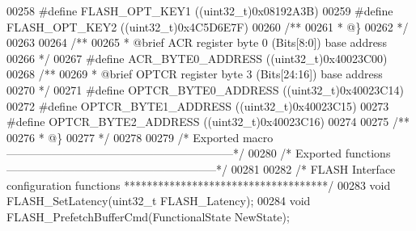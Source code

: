 \begin{DoxyCode}
00258 \textcolor{preprocessor}{#}\textcolor{preprocessor}{define} \textcolor{preprocessor}{FLASH\_OPT\_KEY1}           \textcolor{preprocessor}{(}\textcolor{preprocessor}{(}\textcolor{preprocessor}{uint32\_t}\textcolor{preprocessor}{)}0x08192A3B\textcolor{preprocessor}{)}
00259 \textcolor{preprocessor}{#}\textcolor{preprocessor}{define} \textcolor{preprocessor}{FLASH\_OPT\_KEY2}           \textcolor{preprocessor}{(}\textcolor{preprocessor}{(}\textcolor{preprocessor}{uint32\_t}\textcolor{preprocessor}{)}0x4C5D6E7F\textcolor{preprocessor}{)}
00260 \textcolor{comment}{/**}
00261 \textcolor{comment}{  * @\}}
00262 \textcolor{comment}{  */}
00263 
00264 \textcolor{comment}{/** }
00265 \textcolor{comment}{  * @brief   ACR register byte 0 (Bits[8:0]) base address  }
00266 \textcolor{comment}{  */}
00267 \textcolor{preprocessor}{#}\textcolor{preprocessor}{define} \textcolor{preprocessor}{ACR\_BYTE0\_ADDRESS}           \textcolor{preprocessor}{(}\textcolor{preprocessor}{(}\textcolor{preprocessor}{uint32\_t}\textcolor{preprocessor}{)}0x40023C00\textcolor{preprocessor}{)}
00268 \textcolor{comment}{/** }
00269 \textcolor{comment}{  * @brief   OPTCR register byte 3 (Bits[24:16]) base address  }
00270 \textcolor{comment}{  */}
00271 \textcolor{preprocessor}{#}\textcolor{preprocessor}{define} \textcolor{preprocessor}{OPTCR\_BYTE0\_ADDRESS}         \textcolor{preprocessor}{(}\textcolor{preprocessor}{(}\textcolor{preprocessor}{uint32\_t}\textcolor{preprocessor}{)}0x40023C14\textcolor{preprocessor}{)}
00272 \textcolor{preprocessor}{#}\textcolor{preprocessor}{define} \textcolor{preprocessor}{OPTCR\_BYTE1\_ADDRESS}         \textcolor{preprocessor}{(}\textcolor{preprocessor}{(}\textcolor{preprocessor}{uint32\_t}\textcolor{preprocessor}{)}0x40023C15\textcolor{preprocessor}{)}
00273 \textcolor{preprocessor}{#}\textcolor{preprocessor}{define} \textcolor{preprocessor}{OPTCR\_BYTE2\_ADDRESS}         \textcolor{preprocessor}{(}\textcolor{preprocessor}{(}\textcolor{preprocessor}{uint32\_t}\textcolor{preprocessor}{)}0x40023C16\textcolor{preprocessor}{)}
00274 
00275 \textcolor{comment}{/**}
00276 \textcolor{comment}{  * @\}}
00277 \textcolor{comment}{  */}
00278 
00279 \textcolor{comment}{/* Exported macro ------------------------------------------------------------*/}
00280 \textcolor{comment}{/* Exported functions --------------------------------------------------------*/}
00281 
00282 \textcolor{comment}{/* FLASH Interface configuration functions ************************************/}
00283 \textcolor{keywordtype}{void} FLASH_SetLatency(uint32\_t FLASH\_Latency);
00284 \textcolor{keywordtype}{void} FLASH_PrefetchBufferCmd(FunctionalState NewState);

\end{DoxyCode}
